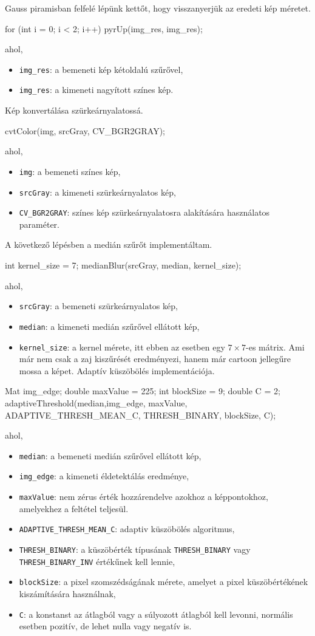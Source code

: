 Gauss piramisban felfelé lépünk kettőt, hogy visszanyerjük az eredeti kép méretet.
\begin{cpp}
for (int i = 0; i < 2; i++) {
    pyrUp(img_res, img_res);
}
\end{cpp}
ahol,
\begin{itemize}
    \item \texttt{img\_res}: a bemeneti kép kétoldalú szűrővel,
    \item \texttt{img\_res}: a kimeneti nagyított színes kép.
\end{itemize}
Kép konvertálása szürkeárnyalatossá. 
\begin{cpp}
cvtColor(img, srcGray, CV_BGR2GRAY);
\end{cpp}
ahol,
\begin{itemize}
    \item \texttt{img}: a bemeneti színes kép,
    \item \texttt{srcGray}: a kimeneti szürkeárnyalatos kép,
    \item \texttt{CV\_BGR2GRAY}: színes kép szürkeárnyalatosra alakítására használatos paraméter.
\end{itemize}
A következő lépésben a medián szűrőt implementáltam.
\begin{cpp}
int kernel_size = 7;
medianBlur(srcGray, median, kernel_size);
\end{cpp}
ahol,
\begin{itemize}
    \item \texttt{srcGray}: a bemeneti szürkeárnyalatos kép,
    \item \texttt{median}: a kimeneti medián szűrővel ellátott kép,
    \item \texttt{kernel\_size}: a kernel mérete, itt ebben az esetben egy $7 \times 7$-es mátrix. Ami már nem csak a zaj kiszűrését eredményezi, hanem már cartoon jellegűre mossa a képet.
Adaptív küszöbölés implementációja.
\end{itemize}
\begin{cpp}
Mat img_edge;
double maxValue = 225;
int blockSize = 9;
double C = 2; 
adaptiveThreshold(median,img_edge, maxValue, ADAPTIVE_THRESH_MEAN_C,
		THRESH_BINARY, blockSize, C); 
\end{cpp}
ahol,
\begin{itemize}
    \item \texttt{median}: a bemeneti medián szűrővel ellátott kép,
    \item \texttt{img\_edge}: a kimeneti éldetektálás eredménye,
    \item \texttt{maxValue}: nem zérus érték hozzárendelve azokhoz a képpontokhoz, amelyekhez a feltétel teljesül.
    \item \texttt{ADAPTIVE\_THRESH\_MEAN\_C}: adaptiv küszöbölés algoritmus,
    \item \texttt{THRESH\_BINARY}: a küszöbérték típusának \texttt{THRESH\_BINARY} vagy \texttt{THRESH\_BINARY\_INV} értékűnek kell lennie,
    \item \texttt{blockSize}: a pixel szomszédságának mérete, amelyet a pixel küszöbértékének kiszámítására használnak,
    \item \texttt{C}: a konstanst az átlagból vagy a súlyozott átlagból kell levonni, normális esetben pozitív, de lehet nulla vagy negatív is.
\end{itemize}
